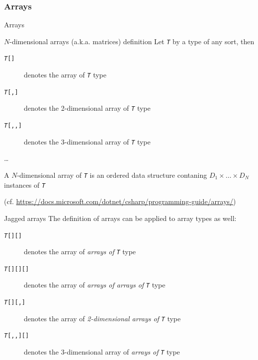 \documentclass[presentation]{beamer}
\begin{document}
\subsubsection{Arrays}

\begin{frame}[allowframebreaks]{\dotnet Arrays}
    \begin{block}{$N$-dimensional arrays (a.k.a. matrices) definition}
        Let \texttt{\textit{T}} by a \dotnet type of any sort, then 
        \begin{description}
            \item[\texttt{\textit{T}\alert{[]}}] denotes the \alert{array of \texttt{\textit{T}}} type
            \item[\texttt{\textit{T}\alert{[,]}}] denotes the \alert{2-dimensional array of \texttt{\textit{T}}} type 
            \item[\texttt{\textit{T}\alert{[,,]}}] denotes the \alert{3-dimensional array of \texttt{\textit{T}}} type 
            \item[\ldots]
        \end{description}

        A $N$-dimensional array of \texttt{\textit{T}} is an \alert{ordered} data structure contaning $D_1 \times \ldots \times D_N$ instances of \texttt{\textit{T}}
    \end{block}

    {\tiny (cf. \url{https://docs.microsoft.com/dotnet/csharp/programming-guide/arrays/})}

    \begin{alertblock}{Jagged arrays}
        The definition of arrays can be applied to array types as well:
        \begin{description}
            \item[\texttt{\textit{T}\alert{[][]}}] denotes the \alert{array of \emph{arrays of} \texttt{\textit{T}}} type
            \item[\texttt{\textit{T}\alert{[][][]}}] denotes the \alert{array of \emph{arrays of arrays of} \texttt{\textit{T}}} type
            \item[\texttt{\textit{T}\alert{[][,]}}] denotes the \alert{array of \emph{2-dimensional arrays of} \texttt{\textit{T}}} type
            \item[\texttt{\textit{T}\alert{[,,][]}}] denotes the \alert{3-dimensional array of \emph{arrays of} \texttt{\textit{T}}} type
        \end{description}


\end{alertblock}
\end{frame}
\end{document}
